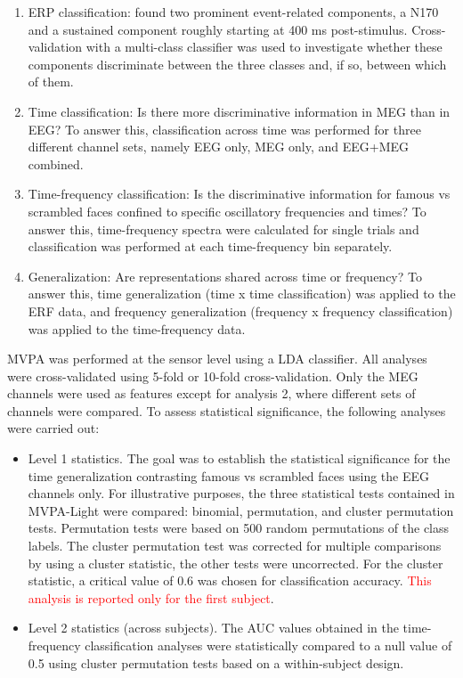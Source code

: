 \documentclass[utf8]{frontiersSCNS} %
\newcommand{\red}[1]{\textcolor{red}{#1}}
\begin{document}
\begin{enumerate}
    \item ERP classification: \cite{Wakeman2015ADataset} found two prominent event-related components, a N170 and a sustained component roughly starting at 400 ms post-stimulus. Cross-validation with a multi-class classifier was used to investigate whether these components discriminate between the three classes and, if so, between which of them.
    \item Time classification: Is there more discriminative information in MEG than in EEG? To answer this, classification across time was performed for three different channel sets, namely EEG only, MEG only, and EEG+MEG combined.
    \item Time-frequency classification: Is the discriminative information for famous vs scrambled faces confined to specific oscillatory frequencies and times? To answer this, time-frequency spectra were calculated for single trials and classification was performed at each time-frequency bin separately.
    \item Generalization: Are representations shared across time \citep{King2014} or frequency? To answer this, time generalization (time x time classification) was applied to the ERF data, and frequency generalization (frequency x frequency classification) was applied to the time-frequency data.
\end{enumerate}

MVPA was performed at the sensor level using a LDA classifier. All analyses were cross-validated using 5-fold or 10-fold cross-validation. Only the MEG channels were used as features except for analysis 2, where different sets of channels were compared. To assess statistical significance, the following analyses were carried out:

\begin{itemize}
    \item Level 1 statistics. The goal was to establish the statistical significance for the time generalization contrasting famous vs scrambled faces using the EEG channels only. For illustrative purposes, the three statistical tests contained in MVPA-Light were compared: binomial, permutation, and cluster permutation tests. Permutation tests were based on 500 random permutations of the class labels. The cluster permutation test was corrected for multiple comparisons by using a cluster statistic, the other tests were uncorrected. For the cluster statistic, a critical value of 0.6 was chosen for classification accuracy. \red{This analysis is reported only for the first subject}.
    \item Level 2 statistics (across subjects). The AUC values obtained in the time-frequency classification analyses were statistically compared to a null value of 0.5 using cluster permutation tests based on a within-subject design.

\end{itemize}
\end{document}
